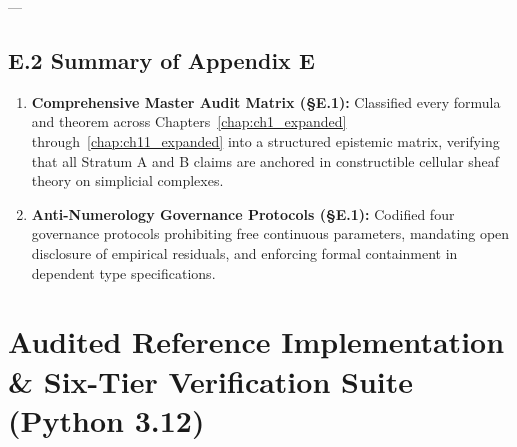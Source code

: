 \documentclass[
    12pt,
    a4paper,
    headings=normal,
    twoside=false,
    open=any,
    parskip=half
]{scrbook}
\begin{document}
---

\section{E.2 Summary of Appendix E}
\label{sec:appE_summary_audit}

\begin{tcolorbox}[colback=maincolor!3!white, colframe=maincolor!80!black, title={\textbf{Grand Synthesis of Appendix E}}]
\begin{enumerate}[leftmargin=1.5em, itemsep=5pt]
    \item \textbf{Comprehensive Master Audit Matrix (§E.1):} Classified every formula and theorem across Chapters~\ref{chap:ch1_expanded} through~\ref{chap:ch11_expanded} into a structured epistemic matrix, verifying that all Stratum A and B claims are anchored in constructible cellular sheaf theory on simplicial complexes.
    \item \textbf{Anti-Numerology Governance Protocols (§E.1):} Codified four governance protocols prohibiting free continuous parameters, mandating open disclosure of empirical residuals, and enforcing formal containment in dependent type specifications.
\end{enumerate}
\end{tcolorbox}


\chapter{Audited Reference Implementation \& Six-Tier Verification Suite (Python 3.12)}
\label{app:audited_reference_implementation}
\end{document}
